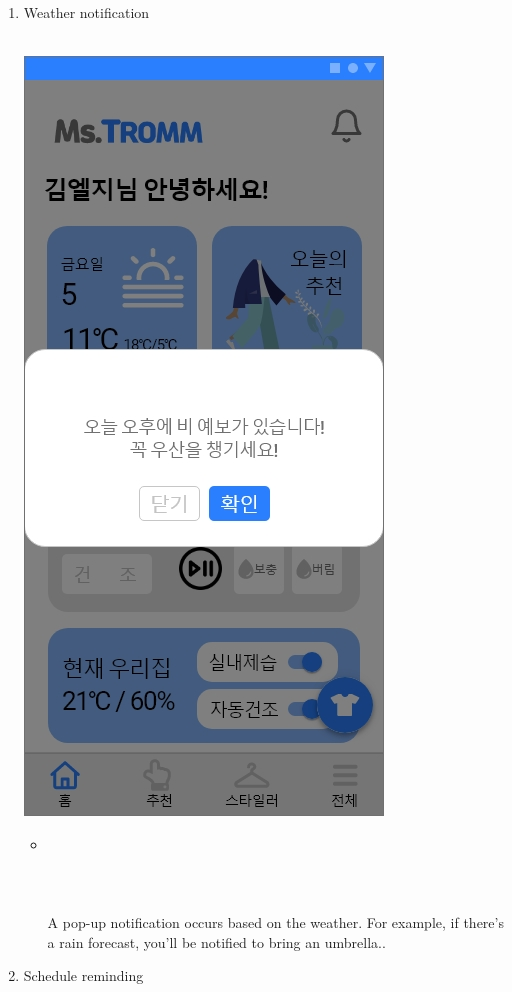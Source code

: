 \documentclass[conference]{IEEEtran}
\begin{document}
\begin{enumerate}
    \item Weather notification\\ \\
        \centerline{\includegraphics[scale=0.32]{assets/날씨 추천 팝업.jpg}}
        \begin{itemize}
            \item[] \\ \\ \\ \\A pop-up notification occurs based on the weather. For example, if there's a rain forecast, you'll be notified to bring an umbrella..\\
        \end{itemize}
    \item Schedule reminding \\ \\

\end{enumerate}
\end{document}
